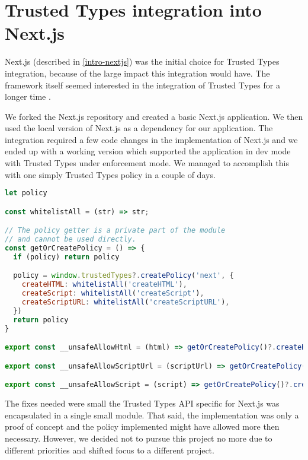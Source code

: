 \chapter{Trusted Types integration into Next.js}

Next.js (described in \ref{intro-nextjs}) was the initial choice for Trusted Types integration,
because of the large impact this integration would have. The framework itself seemed interested in
the integration of Trusted Types for a longer time \cite{nextjs_tt_pr_2020}.

We forked the Next.js repository and created a basic Next.js application. We then used the local
version of Next.js as a dependency for our application. The integration required a few code changes
in the implementation of Next.js and we ended up with a working version which supported the
application in dev mode with Trusted Types under enforcement mode. We managed to accomplish this
with one simply Trusted Types policy in a couple of days.

\bigskip
\begin{lstlisting}[language=JavaScript, caption=Example of Next.js Trusted Types API]
let policy

const whitelistAll = (str) => str;

// The policy getter is a private part of the module
// and cannot be used directly.
const getOrCreatePolicy = () => {
  if (policy) return policy

  policy = window.trustedTypes?.createPolicy('next', {
    createHTML: whitelistAll('createHTML'),
    createScript: whitelistAll('createScript'),
    createScriptURL: whitelistAll('createScriptURL'),
  })
  return policy
}

export const __unsafeAllowHtml = (html) => getOrCreatePolicy()?.createHTML(html) ?? html

export const __unsafeAllowScriptUrl = (scriptUrl) => getOrCreatePolicy()?.createScriptURL(scriptUrl) ?? scriptUrl

export const __unsafeAllowScript = (script) => getOrCreatePolicy()?.createScript(script) ?? script
\end{lstlisting}

The fixes needed were small the Trusted Types API specific for Next.js was encapsulated in a single
small module. That said, the implementation was only a proof of concept and the policy implemented
might have allowed more then necessary. However, we decided not to pursue this project no more due
to different priorities and shifted focus to a different project.

